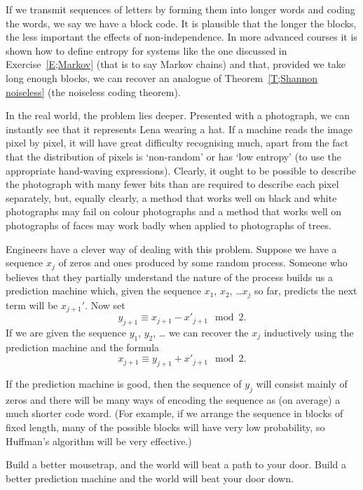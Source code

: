 \documentclass[12pt,a4paper]{article}
\theoremstyle{plain}
\theoremstyle{definition}
\begin{document}
    If we transmit sequences of letters by forming
    them into longer words and coding the words,
    we say we have a block code. It is plausible that
    the longer the blocks, the less important the
    effects of non-independence. In more advanced courses
    it is shown how to define entropy for systems
    like the one discussed in Exercise~\ref{E;Markov}
    (that is to say Markov chains) and that, provided
    we take long enough blocks, we can recover
    an analogue of Theorem~\ref{T;Shannon noiseless}
    (the noiseless coding theorem).

    In the real world, the problem lies deeper.
    Presented with a photograph, we can instantly
    see that it represents Lena wearing a hat.
    If a machine reads the image pixel by pixel,
    it will have great difficulty recognising
    much, apart from the fact that the distribution
    of pixels is `non-random' or has `low entropy'
    (to use the appropriate hand-waving expressions).
    Clearly, it ought to be possible to describe the photograph
    with many fewer bits than are required to describe
    each pixel separately, but, equally clearly,
    a method that works well on black and white photographs
    may fail on colour photographs and a method that works well
    on photographs of faces may work badly
    when applied to photographs
    of trees.

    Engineers have a clever way of dealing with this problem.
    Suppose we have a sequence $x_{j}$ of zeros and ones
    produced by some random process. Someone who believes that
    they partially understand the nature of the process
    builds us a prediction machine
    which, given the sequence $x_{1}$, $x_{2}$, \dots $x_{j}$ so far,
    predicts the next term will be $x_{j+1}'$. Now set
    \[y_{j+1}\equiv x_{j+1}-x'_{j+1}\mod 2.\]
    If we are given the sequence $y_{1}$, $y_{2}$, \dots
    we can recover the $x_{j}$ inductively using the
    prediction machine and the formula
    \[x_{j+1}\equiv y_{j+1}+x'_{j+1}\mod 2.\]

    If the prediction machine is good, then the
    sequence of $y_{j}$ will consist mainly of zeros
    and there will be many ways of encoding the sequence
    as (on average) a much shorter code word.
    (For example, if we arrange the sequence in blocks of
    fixed length, many of the possible blocks will have very low
    probability, so Huffman's algorithm will be very effective.)


    Build a better mousetrap, and the world will beat a path to your door.
    Build a better prediction machine and the world will beat your door down.
\end{document}
